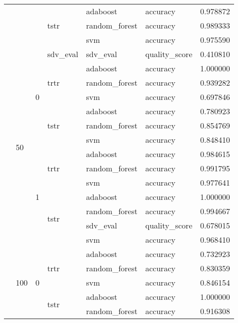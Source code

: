 \begin{longtable}{llllllr}
\cline{4-7} \cline{5-7}
 &  &  & \multirow[t]{3}{*}{tstr} & adaboost & accuracy & 0.978872 \\
\cline{5-7}
 &  &  &  & random_forest & accuracy & 0.989333 \\
\cline{5-7}
 &  &  &  & svm & accuracy & 0.975590 \\
\cline{2-7} \cline{3-7} \cline{4-7} \cline{5-7}
 & \multirow[t]{14}{*}{50} & \multirow[t]{7}{*}{0} & sdv_eval & sdv_eval & quality_score & 0.410810 \\
\cline{4-7} \cline{5-7}
 &  &  & \multirow[t]{3}{*}{trtr} & adaboost & accuracy & 1.000000 \\
\cline{5-7}
 &  &  &  & random_forest & accuracy & 0.939282 \\
\cline{5-7}
 &  &  &  & svm & accuracy & 0.697846 \\
\cline{4-7} \cline{5-7}
 &  &  & \multirow[t]{3}{*}{tstr} & adaboost & accuracy & 0.780923 \\
\cline{5-7}
 &  &  &  & random_forest & accuracy & 0.854769 \\
\cline{5-7}
 &  &  &  & svm & accuracy & 0.848410 \\
\cline{3-7} \cline{4-7} \cline{5-7}
 &  & \multirow[t]{7}{*}{1} & \multirow[t]{3}{*}{trtr} & adaboost & accuracy & 0.984615 \\
\cline{5-7}
 &  &  &  & random_forest & accuracy & 0.991795 \\
\cline{5-7}
 &  &  &  & svm & accuracy & 0.977641 \\
\cline{4-7} \cline{5-7}
 &  &  & \multirow[t]{4}{*}{tstr} & adaboost & accuracy & 1.000000 \\
\cline{5-7}
 &  &  &  & random_forest & accuracy & 0.994667 \\
\cline{5-7}
 &  &  &  & sdv_eval & quality_score & 0.678015 \\
\cline{5-7}
 &  &  &  & svm & accuracy & 0.968410 \\
\cline{2-7} \cline{3-7} \cline{4-7} \cline{5-7}
 & \multirow[t]{14}{*}{100} & \multirow[t]{7}{*}{0} & \multirow[t]{3}{*}{trtr} & adaboost & accuracy & 0.732923 \\
\cline{5-7}
 &  &  &  & random_forest & accuracy & 0.830359 \\
\cline{5-7}
 &  &  &  & svm & accuracy & 0.846154 \\
\cline{4-7} \cline{5-7}
 &  &  & \multirow[t]{4}{*}{tstr} & adaboost & accuracy & 1.000000 \\
\cline{5-7}
 &  &  &  & random_forest & accuracy & 0.916308 \\

\end{longtable}
